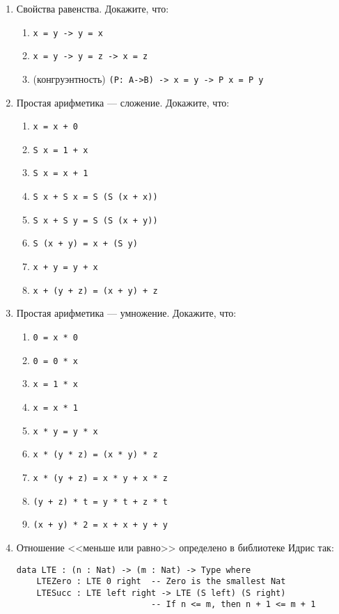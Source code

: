 \documentclass[10pt,a4paper,oneside]{article}
\begin{document}
\begin{enumerate}
\item Свойства равенства. Докажите, что:
\begin{enumerate}
\item \verb!x = y -> y = x!
\item \verb!x = y -> y = z -> x = z!
\item (конгруэнтность) \verb!(P: A->B) -> x = y -> P x = P y!
\end{enumerate}

\item Простая арифметика --- сложение. Докажите, что:
\begin{enumerate} 
\item \verb!x = x + 0!
\item \verb!S x = 1 + x!
\item \verb!S x = x + 1!
\item \verb!S x + S x = S (S (x + x))!
\item \verb!S x + S y = S (S (x + y))!
\item \verb!S (x + y) = x + (S y)!
\item \verb!x + y = y + x!
\item \verb!x + (y + z) = (x + y) + z!
\end{enumerate}

\item Простая арифметика --- умножение. Докажите, что:
\begin{enumerate} 
\item \verb!0 = x * 0!
\item \verb!0 = 0 * x!
\item \verb!x = 1 * x!
\item \verb!x = x * 1!
\item \verb!x * y = y * x!
\item \verb!x * (y * z) = (x * y) * z!
\item \verb!x * (y + z) = x * y + x * z!
\item \verb!(y + z) * t = y * t + z * t!
\item \verb!(x + y) * 2 = x + x + y + y!
\end{enumerate}

\item Отношение <<меньше или равно>> определено в библиотеке Идрис так:

\begin{verbatim}
data LTE : (n : Nat) -> (m : Nat) -> Type where
    LTEZero : LTE 0 right  -- Zero is the smallest Nat
    LTESucc : LTE left right -> LTE (S left) (S right)
                           -- If n <= m, then n + 1 <= m + 1
\end{verbatim}


\end{enumerate}
\end{document}
